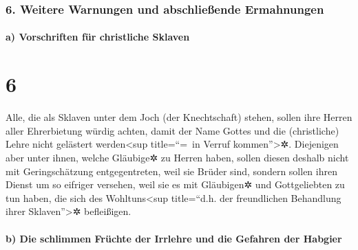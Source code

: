 \hypertarget{weitere-warnungen-und-abschlieuxdfende-ermahnungen}{%
\subsubsection{6. Weitere Warnungen und abschließende
Ermahnungen}\label{weitere-warnungen-und-abschlieuxdfende-ermahnungen}}

\hypertarget{a-vorschriften-fuxfcr-christliche-sklaven}{%
\paragraph{a) Vorschriften für christliche
Sklaven}\label{a-vorschriften-fuxfcr-christliche-sklaven}}

\hypertarget{section-5}{%
\section{6}\label{section-5}}

 Alle, die als Sklaven unter dem Joch (der Knechtschaft)
stehen, sollen ihre Herren aller Ehrerbietung würdig achten, damit der
Name Gottes und die (christliche) Lehre nicht gelästert
werden\textless sup title=``=~in Verruf kommen''\textgreater✲.
 Diejenigen aber unter ihnen, welche Gläubige✲ zu Herren
haben, sollen diesen deshalb nicht mit Geringschätzung entgegentreten,
weil sie Brüder sind, sondern sollen ihren Dienst um so eifriger
versehen, weil sie es mit Gläubigen✲ und Gottgeliebten zu tun haben, die
sich des Wohltuns\textless sup title=``d.h. der freundlichen Behandlung
ihrer Sklaven''\textgreater✲ befleißigen.

\hypertarget{b-die-schlimmen-fruxfcchte-der-irrlehre-und-die-gefahren-der-habgier}{%
\paragraph{b) Die schlimmen Früchte der Irrlehre und die Gefahren der
Habgier}\label{b-die-schlimmen-fruxfcchte-der-irrlehre-und-die-gefahren-der-habgier}}

